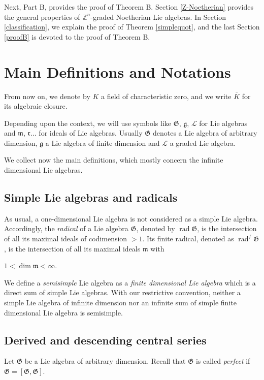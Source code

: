 \documentclass[11pt, letterpaper, reqno]{amsart}
\theoremstyle{definition}
\newcommand{\rad}{\operatorname{rad}}
\newcommand{\Z}{{\mathbb Z}}
\newcommand{\cL}{\mathcal L}
\newcommand{\fg}{\mathfrak{g}}
\newcommand{\fm}{\mathfrak{m}}
\newcommand{\fr}{\mathfrak{r}}
\newcommand{\fG}{\mathfrak{G}}
\begin{document}
Next, Part B, provides the proof of Theorem B.
Section \ref{Z-Noetherian} provides the general properties of $\Z^n$-graded Noetherian Lie algebras.
In Section \ref{classification}, we explain the proof of 
Theorem \ref{simplequot}, and the last Section \ref{proofB} is devoted to the proof of Theorem B.











\section{Main Definitions and Notations}\label{Def}

From now on, we denote by $K$ a field of characteristic zero, and we write $\overline K$ for its algebraic closure.

Depending upon the context, we will 
use symbols like $\fG$, $\fg$, $\cL$ for Lie algebras
and $\fm$, $\fr\ldots $ for ideals of Lie algebras. Usually $\fG$ denotes a Lie algebra of 
arbitrary dimension, $\fg$ a Lie algebra of finite dimension and $\cL$ a graded Lie algebra.



We collect now the main definitions, which mostly concern the  infinite dimensional Lie algebras. 

\subsection{Simple Lie algebras and radicals}
As usual, a one-dimensional Lie algebra
is not considered as a simple Lie algebra.
Accordingly, the
{\it radical} of  a Lie algebra $\fG$, denoted by $\rad \fG$,
is  the intersection  of all  its maximal  ideals of codimension $> 1$. Its finite radical,
denoted as $\rad^f \fG$, is the intersection  of all  its maximal  ideals $\fm$ with

\centerline{$1<\dim \fm<\infty.$}

We define a {\it semisimple} Lie algebra as a {\it finite dimensional Lie algebra} which is a direct sum of simple Lie algebras.  With our restrictive convention, neither a simple Lie algebra of infinite dimension nor an infinite sum
of simple finite dimensional Lie algebra is semisimple.


\subsection{Derived and descending central series}
Let $\fG$ be a Lie algebra of arbitrary dimension.  Recall that $\fG$ is called {\it perfect} if $\fG=[\fG,\fG]$.
\end{document}
